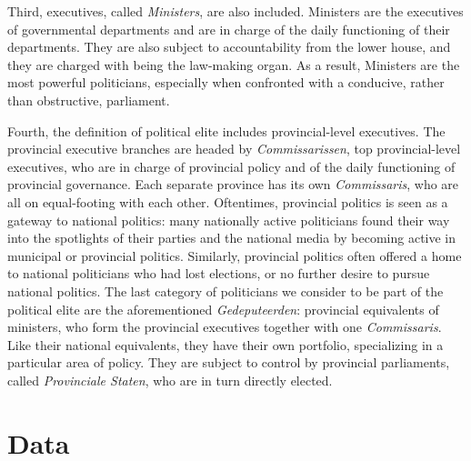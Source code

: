 Third, executives, called \textit{Ministers}, are also included. Ministers are the executives of governmental departments and are in charge of the daily functioning of their departments. They are also subject to accountability from the lower house, and they are charged with being the law-making organ. \autocite{secker1991ministers} As a result, Ministers are the most powerful politicians, especially when confronted with a conducive, rather than obstructive, parliament. \autocite[16]{bosmans2011parlementaire}

Fourth, the definition of political elite includes provincial-level executives. The provincial executive branches are headed by \textit{Commissarissen}, top provincial-level executives, who are in charge of provincial policy and of the daily functioning of provincial governance. Each separate province has its own \textit{Commissaris}, who are all on equal-footing with each other. Oftentimes, provincial politics is seen as a gateway to national politics: many nationally active politicians found their way into the spotlights of their parties and the national media by becoming active in municipal or provincial politics. Similarly, provincial politics often offered a home to national politicians who had lost elections, or no further desire to pursue national politics. The last category of politicians we consider to be part of the political elite are the aforementioned \textit{Gedeputeerden}: provincial equivalents of ministers, who form the provincial executives together with one \textit{Commissaris}. Like their national equivalents, they have their own portfolio, specializing in a particular area of policy. They are subject to control by provincial parliaments, called \textit{Provinciale Staten}, who are in turn directly elected. \autocite{blok1987stemmen}

\section{Data}
